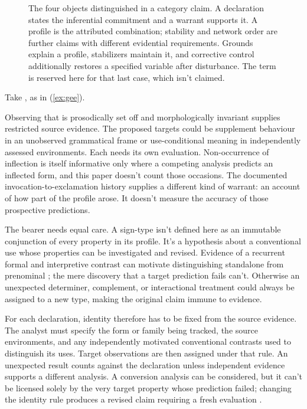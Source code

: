 \documentclass[12pt]{article}
\newcommand{\exmention}[1]{\mention{#1}}
\newcommand{\exfocus}[1]{\uline{#1}}
\begin{document}
\begin{figure}[htbp]
{%
}
\caption{The four objects distinguished in a category claim. A declaration states the inferential commitment and a warrant supports it. A profile is the attributed combination; stability and network order are further claims with different evidential requirements. Grounds explain a profile, stabilizers maintain it, and corrective control additionally restores a specified variable after disturbance. The term  is reserved here for that last case, which isn't claimed.}
\label{fig:four-objects}
\end{figure}

Take , as in (\ref{ex:gee}).

\ea\label{ex:gee} \exmention{\exfocus{Gee}, that's a lot of money.}
\z

Observing that  is prosodically set off and morphologically invariant supplies restricted source evidence. The proposed targets could be supplement behaviour in an unobserved grammatical frame or use-conditional meaning in independently assessed environments. Each needs its own evaluation. Non-occurrence of inflection is itself informative only where a competing analysis predicts an inflected form, and this paper doesn't count those occasions. The documented invocation-to-exclamation history supplies a different kind of warrant: an account of how part of the profile arose. It doesn't measure the accuracy of those prospective predictions.

The bearer needs equal care. A sign-type isn't defined here as an immutable conjunction of every property in its profile. It's a hypothesis about a conventional use whose properties can be investigated and revised. Evidence of a recurrent formal and interpretive contrast can motivate distinguishing standalone from prenominal ; the mere discovery that a target prediction fails can't. Otherwise an unexpected determiner, complement, or interactional treatment could always be assigned to a new type, making the original claim immune to evidence.

For each declaration, identity therefore has to be fixed from the source evidence. The analyst must specify the form or family being tracked, the source environments, and any independently motivated conventional contrasts used to distinguish its uses. Target observations are then assigned under that rule. An unexpected result counts against the declaration unless independent evidence supports a different analysis. A conversion analysis can be considered, but it can't be licensed solely by the very target property whose prediction failed; changing the identity rule produces a revised claim requiring a fresh evaluation \citep[16]{reynolds2026projectibilityHistory}.
\end{document}
